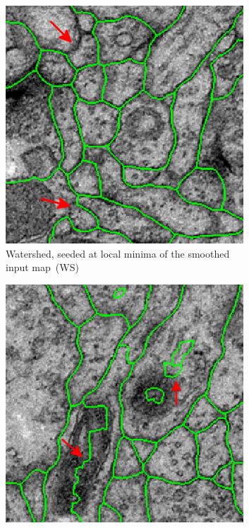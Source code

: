 \begin{figure}
    \begin{subfigure}[t]{0.46 \linewidth}
        \centering
        \includegraphics[width=0.98\textwidth]{figures/MWS/images/ws_2.png}
        \caption{Watershed, seeded at local minima of the smoothed input map~(WS)} \label{fig:ws}
    \end{subfigure}\hspace{0.5cm}%
    \begin{subfigure}[t]{0.46 \linewidth}
        \centering
        \includegraphics[width=0.98\textwidth]{figures/MWS/images/wsdt_22.png}

\end{subfigure}
\end{figure}
